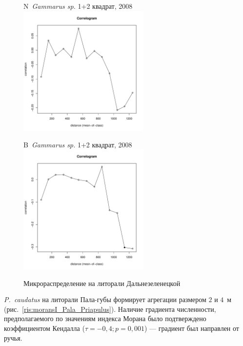 \begin{figure}[h]
	\begin{minipage}[b]{.46\linewidth}
	\begin{center}
	{\small N~{\it Gammarus sp.} 1+2 квадрат, 2008}
		\includegraphics[width=65mm]{../Barenc_Sea/distribution_Moran/Plyazh0812_moran_N_Gammarus_sp_.pdf}
	\end{center}
	\end{minipage}
%
	\hfil %
%
	\begin{minipage}[b]{.46\linewidth}
	\begin{center}
	{\small B~{\it Gammarus sp.} 1+2 квадрат, 2008}
		\includegraphics[width=65mm]{../Barenc_Sea/distribution_Moran/Plyazh0812_moran_B_Gammarus_sp_.pdf}
	\end{center}
	\end{minipage}
	\caption{Микрораспределение на литорали Дальнезеленецкой}
	\label{ris:moransI_DZ}
	\end{figure}


{\it P.~caudatus} на литорали Пала-губы формирует агрегации размером $2$ и $4$~м (рис.~\ref{ris:moransI_Pala_Priapulus}). 
Наличие градиента численности, предполагаемого по значениям индекса Морана было подтверждено коэффициентом Кендалла ($\tau = -0,4; p = 0,001$) --- градиент был направлен от ручья.

